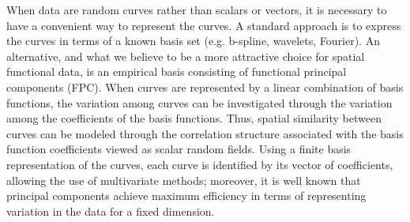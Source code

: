 
When data are random curves rather than scalars or vectors, it is necessary to have a convenient way to represent the curves.  A standard approach is to express the curves in terms of a known basis set (e.g. b-spline, wavelets, Fourier). An alternative, and what we believe to be a more attractive choice for spatial functional data, is an empirical basis consisting of functional principal components (FPC). When curves are represented by a linear combination of basis functions, the variation among curves can be investigated through the variation among the coefficients of the basis functions. Thus, spatial similarity between curves can be modeled through the correlation structure associated with the basis function coefficients viewed as scalar random fields. Using a finite basis representation of the curves, each curve is identified by its vector of coefficients, allowing the use of multivariate methods; moreover, it is well known that principal components achieve maximum efficiency in terms of representing variation in the data for a fixed dimension. 

%
%

